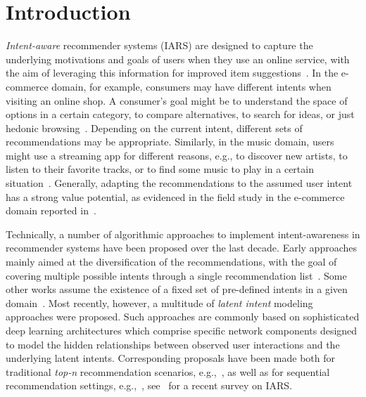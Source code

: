 \documentclass[sigconf,natbib=true,nonacm]{acmart}
\begin{document}
\maketitle
\section{Introduction}
\label{sec:introduction}
\emph{Intent-aware} recommender systems (IARS) are designed to capture the underlying motivations and goals of users when they use an online service, with the aim of leveraging this information for improved item suggestions~\cite{rafique_developing_2023,jannach2024intent}. In the e-commerce domain, for example, consumers may have different intents when visiting an online shop. A consumer's goal might be to understand the space of options in a certain category, to compare alternatives, to search for ideas, or just hedonic browsing~\cite{shi_improving_2017}. Depending on the current intent, different sets of recommendations may be appropriate. Similarly, in the music domain, users might use a streaming app for different reasons, e.g., to discover new artists, to listen to their favorite tracks, or to find some music to play in a certain situation~\cite{mehrotra_jointly_2019,Kapoor:2015:ILE:2792838.2800172}.  Generally, adapting the recommendations to the assumed user intent has a strong value potential, as evidenced in the field study in the e-commerce domain reported in~\cite{shi_improving_2017}.

Technically, a number of algorithmic approaches to implement intent-awareness in recommender systems have been proposed over the last decade. Early approaches mainly aimed at the diversification of the recommendations, with the goal of covering multiple possible intents through a single recommendation list~\cite{vargas_intent-oriented_2011,wasilewski_intent-aware_2016}. Some other works assume the existence of a fixed set of pre-defined intents in a given domain~\cite{shi_improving_2017,mehrotra_jointly_2019}. Most recently, however, a multitude of \emph{latent intent} modeling approaches were proposed. Such approaches are commonly based on sophisticated deep learning architectures which comprise specific network components designed to model the hidden relationships between observed user interactions and the underlying latent intents. Corresponding proposals have been made both for traditional \emph{top-n} recommendation scenarios, e.g.,~\cite{ma_learning_2019,wang_disentangled_2020,wang_learning_2021}, as well as for sequential recommendation settings, e.g.,~\cite{tanjim_attentive_2020,di_multi-intent_2022,li_multi-intention_2023}, see~\cite{jannach2024intent} for a recent survey on IARS.
\end{document}
